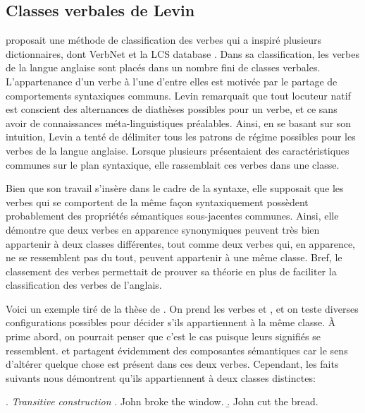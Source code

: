 \subsection{Classes verbales de Levin}

\cite{verb-classes.levin.1993} proposait une méthode de classification des verbes qui a inspiré plusieurs dictionnaires, dont VerbNet \citep{SchulerVerbnetBroadcoverageComprehensive2005} et la LCS database \citep{AyanGeneratingParsingLexicon2002a,DorrUseLexicalSemantics1992}. Dans sa classification, les verbes de la langue anglaise sont placés dans un nombre fini de classes verbales. L'appartenance d'un verbe à l'une d'entre elles est motivée par le partage de comportements syntaxiques communs. Levin remarquait que tout locuteur natif est conscient des alternances de diathèses possibles pour un verbe, et ce sans avoir de connaissances méta-linguistiques préalables. Ainsi, en se basant sur son intuition, Levin a tenté de délimiter tous les patrons de régime possibles pour les verbes de la langue anglaise. Lorsque plusieurs présentaient des caractéristiques communes sur le plan syntaxique, elle rassemblait ces verbes dans une classe.

Bien que son travail s'insère dans le cadre de la syntaxe, elle supposait que les verbes qui se comportent de la même façon syntaxiquement possèdent probablement des propriétés sémantiques sous-jacentes communes. Ainsi, elle démontre que deux verbes en apparence synonymiques peuvent très bien appartenir à deux classes différentes, tout comme deux verbes qui, en apparence, ne se ressemblent pas du tout, peuvent appartenir à une même classe. Bref, le classement des verbes permettait de prouver sa théorie en plus de faciliter la classification des verbes de l'anglais.

Voici un exemple tiré de la thèse de \cite[pp.~12--13]{SchulerVerbnetBroadcoverageComprehensive2005}. On prend les verbes  et , et on teste diverses configurations possibles pour décider s'ils appartiennent à la même classe. À prime abord, on pourrait penser que c'est le cas puisque leurs signifiés se ressemblent.  et  partagent évidemment des composantes sémantiques car le sens d'altérer quelque chose est présent dans ces deux verbes. Cependant, les faits suivants nous démontrent qu'ils appartiennent à deux classes distinctes:

\ex. \label{ex:transitive} \emph{Transitive construction}
	\a. John broke the window.
	\b. John cut the bread.
	
